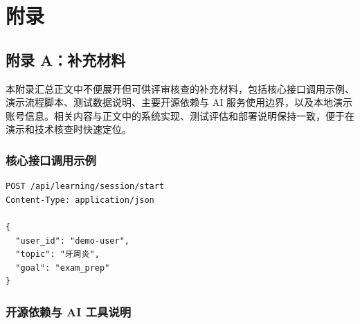 \chapter*{附录}
{}

\section*{附录 A：补充材料}
{}

本附录汇总正文中不便展开但可供评审核查的补充材料，包括核心接口调用示例、演示流程脚本、测试数据说明、主要开源依赖与 AI 服务使用边界，以及本地演示账号信息。相关内容与正文中的系统实现、测试评估和部署说明保持一致，便于在演示和技术核查时快速定位。

\subsection*{核心接口调用示例}

\begin{lstlisting}
POST /api/learning/session/start
Content-Type: application/json

{
  "user_id": "demo-user",
  "topic": "牙周炎",
  "goal": "exam_prep"
}
\end{lstlisting}


\subsection*{开源依赖与 AI 工具说明}

